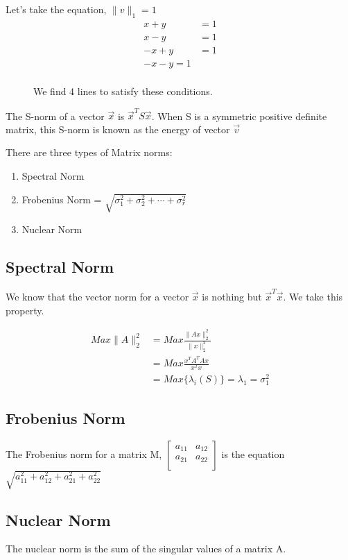\documentclass[twoside]{report}
\begin{document}
Let's take the equation, $\|v\|_1 = 1$
\begin{align*}
	x + y &= 1 \\
	x - y &= 1 \\
	- x + y &= 1 \\
	-x - y = 1 \\
\end{align*}
\begin{figure}[ht]
    \centering
    \caption{We find 4 lines to satisfy these conditions.}
    \label{fig:l1eq1}
\end{figure}
\begin{definition}[S-norm]
	The S-norm of a vector $\vec{x}$ is $\vec{x}^T S \vec{x}$. When S is a symmetric positive definite matrix, this S-norm is known as the energy of vector $\vec{v}$
\end{definition}
\pagebreak
There are three types of Matrix norms:
\begin{enumerate}
	\item Spectral Norm
	\item Frobenius Norm = $\sqrt{\sigma_1^2 + \sigma_2^2 + \cdots + \sigma_r^2}$
	\item Nuclear Norm
\end{enumerate}
\subsection{Spectral Norm}
We know that the vector norm for a vector $\vec{x}$ is nothing but $\vec{x}^T \vec{x}$. We take this property.

\begin{align*}
	Max \|A\|_2^2 &= Max \frac{\|Ax\|_2^2}{\|x\|_2^2} \\
		      &= Max \frac{x^TA^TAx}{x^Tx} \\
		      &= Max \{\lambda_i(S)\} = \lambda_1 = \sigma_1^2
\end{align*}
\subsection{Frobenius Norm}
The Frobenius norm for a matrix M,
$
\begin{bmatrix}
	a_{11} & a_{12}\\
a_{21} & a_{22} \\
\end{bmatrix}
$
is the equation $\sqrt{a_{11}^2 + a_{12}^2 + a_{21}^2 + a_{22}^2}$
\subsection{Nuclear Norm}
The nuclear norm is the sum of the singular values of a matrix A.
\end{document}
